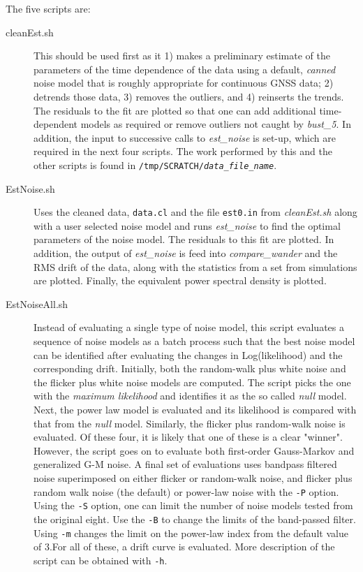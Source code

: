 \documentclass[12pt]{amsart}
\begin{document}
The five scripts are:
\begin{description}
\item[cleanEst.sh] This should be used first as it 1) makes a preliminary estimate of the parameters of the time dependence of the 
data using a default, \textit{canned} noise model that is roughly appropriate for continuous GNSS data; 2) detrends those data, 3) removes the outliers, and 4) reinserts the trends. The residuals to the fit are plotted so that one can
add additional time-dependent models as required or remove outliers not caught by \textit{bust\_5}.   In addition, the input to successive calls to \textit{est\_noise} is set-up, which are required in the next four scripts. The work performed by this and the other scripts is
found in \texttt{/tmp/SCRATCH/\textit{data\_file\_name}}.
\item[EstNoise.sh]  Uses the cleaned data, \texttt{data.cl} and the file \texttt{est0.in} from \textit{cleanEst.sh} along with a user selected noise
model and runs \textit{est\_noise} to find the optimal parameters of the noise model.  The residuals to this fit are plotted.
In addition, the output of \textit{est\_noise} is feed into \textit{compare\_wander} and the RMS drift of the data, along with
the statistics from a set from simulations are plotted.  Finally, the equivalent power spectral density is plotted.
\item[EstNoiseAll.sh]  Instead of evaluating a single type of noise model, this script evaluates a sequence of noise models
as a batch process such that the best noise model can be identified after evaluating the changes in Log(likelihood) and
the corresponding drift.  Initially, both the random-walk plus white noise and the flicker plus white noise models are
computed.  The script picks the one with the \textit{maximum likelihood} and identifies it as the so called \textit{null} model.
Next, the power law model is evaluated and its likelihood is compared with that from the \textit{null} model. Similarly,
the flicker plus random-walk noise is evaluated. Of these four, it is likely that one of these is a clear "winner". However,
the script goes on to evaluate both first-order Gauss-Markov and generalized G-M noise. A final set of evaluations uses
bandpass filtered noise superimposed on either flicker or random-walk noise, and flicker plus random walk noise (the default) or power-law noise with the \texttt{-P} option.  Using the \texttt{-S} option,
one can limit the number of noise models tested from the original eight.  Use the \texttt{-B} to change the limits
of the band-passed filter. Using \texttt{-m} changes the limit on the power-law index from the default value of $3$.For all of these, a drift curve is evaluated. More description of the script can be obtained with \texttt{-h}.
\end{description}
\end{document}
